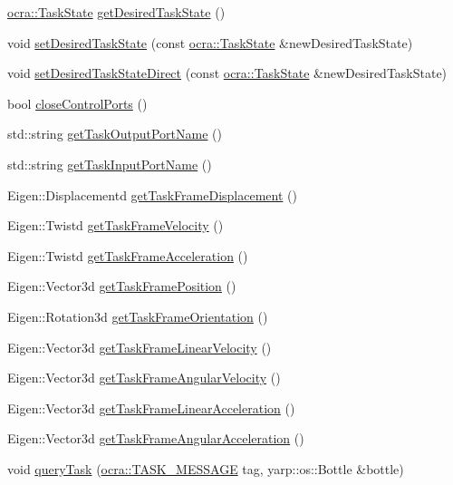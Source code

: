 \begin{DoxyCompactItemize}
\item 
\hyperlink{classocra_1_1TaskState}{ocra\+::\+Task\+State} \hyperlink{classocra__recipes_1_1TaskConnection_a655f96a4c535179184edf67a961776e7}{get\+Desired\+Task\+State} ()
\item 
void \hyperlink{classocra__recipes_1_1TaskConnection_a3a843b685459c6db2ec4b99159d57e6a}{set\+Desired\+Task\+State} (const \hyperlink{classocra_1_1TaskState}{ocra\+::\+Task\+State} \&new\+Desired\+Task\+State)
\item 
void \hyperlink{classocra__recipes_1_1TaskConnection_a4619e5f6107d88bc50165c812e219004}{set\+Desired\+Task\+State\+Direct} (const \hyperlink{classocra_1_1TaskState}{ocra\+::\+Task\+State} \&new\+Desired\+Task\+State)
\item 
bool \hyperlink{classocra__recipes_1_1TaskConnection_abc322bd749033fad00193ca63701a1f5}{close\+Control\+Ports} ()
\item 
std\+::string \hyperlink{classocra__recipes_1_1TaskConnection_add06cf3474cdf145340850854c67ccd1}{get\+Task\+Output\+Port\+Name} ()
\item 
std\+::string \hyperlink{classocra__recipes_1_1TaskConnection_ac6368ebb5b32d5319cec98fcf09d38fd}{get\+Task\+Input\+Port\+Name} ()
\item 
Eigen\+::\+Displacementd \hyperlink{classocra__recipes_1_1TaskConnection_a4595bb517cd965bc9f08f609e3e15e78}{get\+Task\+Frame\+Displacement} ()
\item 
Eigen\+::\+Twistd \hyperlink{classocra__recipes_1_1TaskConnection_a3ae346f85c5b8655698630b3f3474886}{get\+Task\+Frame\+Velocity} ()
\item 
Eigen\+::\+Twistd \hyperlink{classocra__recipes_1_1TaskConnection_a83e90c36f53ffda20f73b242c5de285b}{get\+Task\+Frame\+Acceleration} ()
\item 
Eigen\+::\+Vector3d \hyperlink{classocra__recipes_1_1TaskConnection_a263fc00649e98cfa61393f63cfe9f84a}{get\+Task\+Frame\+Position} ()
\item 
Eigen\+::\+Rotation3d \hyperlink{classocra__recipes_1_1TaskConnection_a4163584c89cc8680131bd473b9359ffb}{get\+Task\+Frame\+Orientation} ()
\item 
Eigen\+::\+Vector3d \hyperlink{classocra__recipes_1_1TaskConnection_ab0948b1336f171e607ca79ca03a466c5}{get\+Task\+Frame\+Linear\+Velocity} ()
\item 
Eigen\+::\+Vector3d \hyperlink{classocra__recipes_1_1TaskConnection_a57f6e6e29aa2d09bff7c9aa7e7a322f7}{get\+Task\+Frame\+Angular\+Velocity} ()
\item 
Eigen\+::\+Vector3d \hyperlink{classocra__recipes_1_1TaskConnection_a4c489ec411ea7cb026213ac53111431d}{get\+Task\+Frame\+Linear\+Acceleration} ()
\item 
Eigen\+::\+Vector3d \hyperlink{classocra__recipes_1_1TaskConnection_abae3e5305e8de9be7ccf34fdbb4d6e1a}{get\+Task\+Frame\+Angular\+Acceleration} ()
\item 
void \hyperlink{classocra__recipes_1_1TaskConnection_ae4450b3d9912471527716d7fe11e279e}{query\+Task} (\hyperlink{namespaceocra_ae51761f3980546f5ee4cbc6ebe4216dd}{ocra\+::\+T\+A\+S\+K\+\_\+\+M\+E\+S\+S\+A\+GE} tag, yarp\+::os\+::\+Bottle \&bottle)
\end{DoxyCompactItemize}


